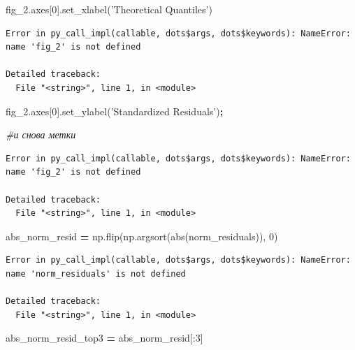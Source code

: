 \documentclass[]{book}
\newenvironment{Shaded}{\begin{snugshade}}{\end{snugshade}}
\newcommand{\BuiltInTok}[1]{#1}
\newcommand{\CommentTok}[1]{\textcolor[rgb]{0.56,0.35,0.01}{\textit{#1}}}
\newcommand{\DecValTok}[1]{\textcolor[rgb]{0.00,0.00,0.81}{#1}}
\newcommand{\NormalTok}[1]{#1}
\newcommand{\OperatorTok}[1]{\textcolor[rgb]{0.81,0.36,0.00}{\textbf{#1}}}
\newcommand{\StringTok}[1]{\textcolor[rgb]{0.31,0.60,0.02}{#1}}
\begin{document}
\begin{Shaded}
\begin{Highlighting}[]
\NormalTok{fig_2.axes[}\DecValTok{0}\NormalTok{].set_xlabel(}\StringTok{'Theoretical Quantiles'}\NormalTok{)}
\end{Highlighting}
\end{Shaded}

\begin{verbatim}
Error in py_call_impl(callable, dots$args, dots$keywords): NameError: name 'fig_2' is not defined

Detailed traceback: 
  File "<string>", line 1, in <module>
\end{verbatim}

\begin{Shaded}
\begin{Highlighting}[]
\NormalTok{fig_2.axes[}\DecValTok{0}\NormalTok{].set_ylabel(}\StringTok{'Standardized Residuals'}\NormalTok{)}\OperatorTok{;}

\CommentTok{#и снова метки}
\end{Highlighting}
\end{Shaded}

\begin{verbatim}
Error in py_call_impl(callable, dots$args, dots$keywords): NameError: name 'fig_2' is not defined

Detailed traceback: 
  File "<string>", line 1, in <module>
\end{verbatim}

\begin{Shaded}
\begin{Highlighting}[]
\NormalTok{abs_norm_resid }\OperatorTok{=}\NormalTok{ np.flip(np.argsort(}\BuiltInTok{abs}\NormalTok{(norm_residuals)), }\DecValTok{0}\NormalTok{)}
\end{Highlighting}
\end{Shaded}

\begin{verbatim}
Error in py_call_impl(callable, dots$args, dots$keywords): NameError: name 'norm_residuals' is not defined

Detailed traceback: 
  File "<string>", line 1, in <module>
\end{verbatim}

\begin{Shaded}
\begin{Highlighting}[]
\NormalTok{abs_norm_resid_top3 }\OperatorTok{=}\NormalTok{ abs_norm_resid[:}\DecValTok{3}\NormalTok{]}
\end{Highlighting}
\end{Shaded}
\end{document}

